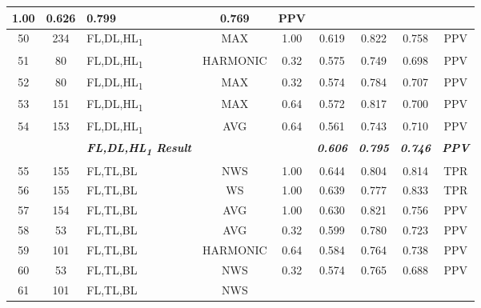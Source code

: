 \begin{table}[H]
{\begin{tabular}{cc|l|cc|c|c|c|c|}
    1.00 &
    0.626 &
    0.799 &
    0.769 &
    PPV \\ \hline
  \multicolumn{1}{|c|}{50} &
    234 &
    FL,DL,HL\textsubscript{1} &
    \multicolumn{1}{c|}{MAX} &
    1.00 &
    0.619 &
    0.822 &
    0.758 &
    PPV \\ \hline
  \multicolumn{1}{|c|}{51} &
    80 &
    FL,DL,HL\textsubscript{1} &
    \multicolumn{1}{c|}{HARMONIC} &
    0.32 &
    0.575 &
    0.749 &
    0.698 &
    PPV \\ \hline
  \multicolumn{1}{|c|}{52} &
    80 &
    FL,DL,HL\textsubscript{1} &
    \multicolumn{1}{c|}{MAX} &
    0.32 &
    0.574 &
    0.784 &
    0.707 &
    PPV \\ \hline
  \multicolumn{1}{|c|}{53} &
    151 &
    FL,DL,HL\textsubscript{1} &
    \multicolumn{1}{c|}{MAX} &
    0.64 &
    0.572 &
    0.817 &
    0.700 &
    PPV \\ \hline
  \multicolumn{1}{|c|}{54} &
    153 &
    FL,DL,HL\textsubscript{1} &
    \multicolumn{1}{c|}{AVG} &
    0.64 &
    0.561 &
    0.743 &
    0.710 &
    PPV \\ \hline
   &
     &
    \textit{\textbf{FL,DL,HL\textsubscript{1} Result}} &
     &
     &
    \textit{\textbf{0.606}} &
    \textit{\textbf{0.795}} &
    \textit{\textbf{0.746}} &
    \textit{\textbf{PPV}} \\ \hline
  \multicolumn{1}{|c|}{55} &
    155 &
    FL,TL,BL &
    \multicolumn{1}{c|}{NWS} &
    1.00 &
    0.644 &
    0.804 &
    0.814 &
    TPR \\ \hline
  \multicolumn{1}{|c|}{56} &
    155 &
    FL,TL,BL &
    \multicolumn{1}{c|}{WS} &
    1.00 &
    0.639 &
    0.777 &
    0.833 &
    TPR \\ \hline
  \multicolumn{1}{|c|}{57} &
    154 &
    FL,TL,BL &
    \multicolumn{1}{c|}{AVG} &
    1.00 &
    0.630 &
    0.821 &
    0.756 &
    PPV \\ \hline
  \multicolumn{1}{|c|}{58} &
    53 &
    FL,TL,BL &
    \multicolumn{1}{c|}{AVG} &
    0.32 &
    0.599 &
    0.780 &
    0.723 &
    PPV \\ \hline
  \multicolumn{1}{|c|}{59} &
    101 &
    FL,TL,BL &
    \multicolumn{1}{c|}{HARMONIC} &
    0.64 &
    0.584 &
    0.764 &
    0.738 &
    PPV \\ \hline
  \multicolumn{1}{|c|}{60} &
    53 &
    FL,TL,BL &
    \multicolumn{1}{c|}{NWS} &
    0.32 &
    0.574 &
    0.765 &
    0.688 &
    PPV \\ \hline
  \multicolumn{1}{|c|}{61} &
    101 &
    FL,TL,BL &
    \multicolumn{1}{c|}{NWS} &

\end{tabular}}
\end{table}
